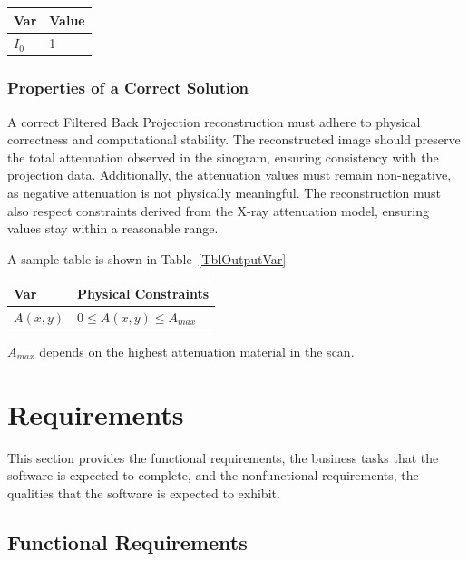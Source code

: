 \documentclass[12pt]{article}
\begin{document}
\begin{table}[!h]
\caption{Specification Parameter Values} \label{TblSpecParams}
\renewcommand{\arraystretch}{1.2}
\noindent \begin{longtable*}{l l}
  \toprule
  \textbf{Var} & \textbf{Value} \\
  \midrule
  $I_0$ & 1 \\
  \bottomrule
\end{longtable*}
\end{table}

\subsubsection{Properties of a Correct Solution} \label{sec_CorrectSolution}

\noindent
A correct Filtered Back Projection reconstruction must adhere to physical
correctness and computational stability. The reconstructed image should preserve
the total attenuation observed in the sinogram, ensuring consistency with the
projection data. Additionally, the attenuation values must remain non-negative,
as negative attenuation is not physically meaningful. The reconstruction must
also respect constraints derived from the X-ray attenuation model, ensuring
values stay within a reasonable range.

A sample table is shown in Table~\ref{TblOutputVar}

\begin{table}[!h]
\caption{Output Variables} \label{TblOutputVar}
\renewcommand{\arraystretch}{1.2}
\noindent \begin{longtable*}{l l}
  \toprule
  \textbf{Var} & \textbf{Physical Constraints} \\
  \midrule
  $A(x,y)$ & $0 \leq A(x,y) \leq A_{max}$\\
  \bottomrule
\end{longtable*}
\end{table}
$A_{max}$ depends on the highest attenuation material in the scan.
\section{Requirements} \label{requirement}
This section provides the functional requirements, the business tasks that the
software is expected to complete, and the nonfunctional requirements, the
qualities that the software is expected to exhibit.

\subsection{Functional Requirements}
\end{document}
